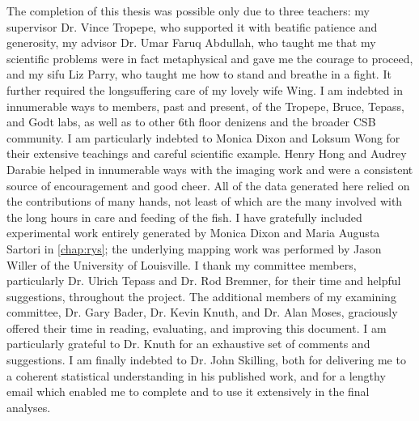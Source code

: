 \documentclass{ut-thesis}
\begin{document}
\begin{preliminary}
\begin{acknowledgements}
The completion of this thesis was possible only due to three teachers: my supervisor Dr. Vince Tropepe, who supported it with beatific patience and generosity, my advisor Dr. Umar Faruq Abdullah, who taught me that my scientific problems were in fact metaphysical and gave me the courage to proceed, and my sifu Liz Parry, who taught me how to stand and breathe in a fight. It further required the longsuffering care of my lovely wife Wing. I am indebted in innumerable ways to members, past and present, of the Tropepe, Bruce, Tepass, and Godt labs, as well as to other 6th floor denizens and the broader CSB community. I am particularly indebted to Monica Dixon and Loksum Wong for their extensive teachings and careful scientific example. Henry Hong and Audrey Darabie helped in innumerable ways with the imaging work and were a consistent source of encouragement and good cheer. All of the data generated here relied on the contributions of many hands, not least of which are the many involved with the long hours in care and feeding of the fish. I have gratefully included experimental work entirely generated by Monica Dixon and Maria Augusta Sartori in \autoref{chap:rys}; the underlying mapping work was performed by Jason Willer of the University of Louisville. I thank my committee members, particularly Dr. Ulrich Tepass and Dr. Rod Bremner, for their time and helpful suggestions, throughout the project. The additional members of my examining committee, Dr. Gary Bader, Dr. Kevin Knuth, and Dr. Alan Moses, graciously offered their time in reading, evaluating, and improving this document. I am particularly grateful to Dr. Knuth for an exhaustive set of comments and suggestions. I am finally indebted to Dr. John Skilling, both for delivering me to a coherent statistical understanding in his published work, and for a lengthy email which enabled me to complete  and to use it extensively in the final analyses.
\end{acknowledgements}

\newpage

\renewcommand{\contentsname}{Table of Contents}
\tableofcontents

\listoftables

\listoffigures


\end{preliminary}
\end{document}
